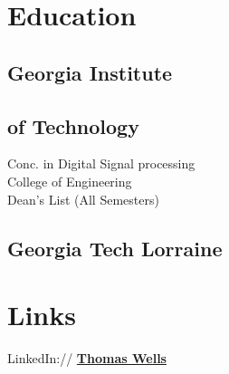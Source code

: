\documentclass[letterpaper]{deedy-resume-openfont} %
\begin{document}
\begin{minipage}[t]{0.33\textwidth} %


\section{Education} 

\subsection{Georgia Institute}
\subsection{of Technology}


Conc. in Digital Signal processing \\
College of Engineering \\
Dean's List (All Semesters) \\




\subsection{Georgia Tech Lorraine}




\section{Links} 

LinkedIn:// \href{https://www.linkedin.com/in/thomasfwells}{\bf Thomas Wells} \\


\end{minipage}
\end{document}

